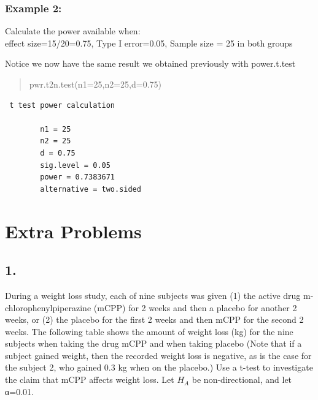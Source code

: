 \documentclass[
]{book}
\begin{document}
\hypertarget{example-2-1}{%
\subsubsection{Example 2:}\label{example-2-1}}

Calculate the power available when:\\
effect size=15/20=0.75, Type I error=0.05, Sample size = 25 in both groups

Notice we now have the same result we obtained previously with power.t.test

\begin{quote}
pwr.t2n.test(n1=25,n2=25,d=0.75)
\end{quote}

\begin{verbatim}
 t test power calculation 

        n1 = 25
        n2 = 25
        d = 0.75
        sig.level = 0.05
        power = 0.7383671
        alternative = two.sided
\end{verbatim}

\hypertarget{extra-problems}{%
\section{Extra Problems}\label{extra-problems}}

\hypertarget{section}{%
\subsection{1.}\label{section}}

During a weight loss study, each of nine subjects was given (1) the active drug m-chlorophenylpiperazine (mCPP) for 2 weeks and then a placebo for another 2 weeks, or (2) the placebo for the first 2 weeks and then mCPP for the second 2 weeks. The following table shows the amount of weight loss (kg) for the nine subjects when taking the drug mCPP and when taking placebo (Note that if a subject gained weight, then the recorded weight loss is negative, as is the case for the subject 2, who gained 0.3 kg when on the placebo.) Use a t-test to investigate the claim that mCPP affects weight loss. Let \(H_A\) be non-directional, and let α=0.01.
\end{document}
